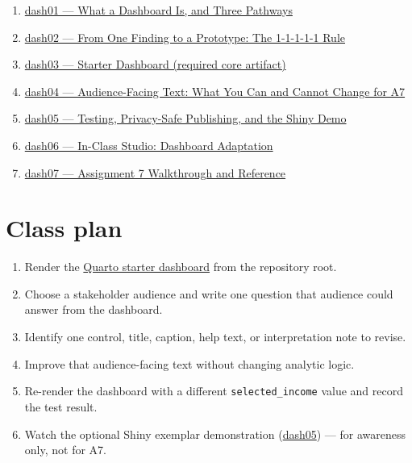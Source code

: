 \documentclass[
  letterpaper,
  DIV=11,
  numbers=noendperiod,
  oneside]{scrreprt}
\providecommand{\tightlist}{%
  \setlength{\itemsep}{0pt}\setlength{\parskip}{0pt}}
\begin{document}
\begin{enumerate}
\def\labelenumi{\arabic{enumi}.}
\tightlist
\item
  \href{dash01-overview-and-pathways.qmd}{dash01 --- What a Dashboard
  Is, and Three Pathways}
\item
  \href{dash02-from-eda-to-prototype.qmd}{dash02 --- From One Finding to
  a Prototype: The 1-1-1-1-1 Rule}
\item
  \href{dash03-starter-dashboard.qmd}{dash03 --- Starter Dashboard
  (required core artifact)}
\item
  \href{dash04-audience-and-ui-text.qmd}{dash04 --- Audience-Facing
  Text: What You Can and Cannot Change for A7}
\item
  \href{dash05-testing-privacy-and-shiny-demo.qmd}{dash05 --- Testing,
  Privacy-Safe Publishing, and the Shiny Demo}
\item
  \href{dash06-studio-dashboard-adaptation.qmd}{dash06 --- In-Class
  Studio: Dashboard Adaptation}
\item
  \href{dash07-assignment-a7-and-reference.qmd}{dash07 --- Assignment 7
  Walkthrough and Reference}
\end{enumerate}

\section*{Class plan}\label{class-plan-2}


\begin{enumerate}
\def\labelenumi{\arabic{enumi}.}
\tightlist
\item
  Render the \href{dash03-starter-dashboard.qmd}{Quarto starter
  dashboard} from the repository root.
\item
  Choose a stakeholder audience and write one question that audience
  could answer from the dashboard.
\item
  Identify one control, title, caption, help text, or interpretation
  note to revise.
\item
  Improve that audience-facing text without changing analytic logic.
\item
  Re-render the dashboard with a different \texttt{selected\_income}
  value and record the test result.
\item
  Watch the optional Shiny exemplar demonstration
  (\href{dash05-testing-privacy-and-shiny-demo.qmd}{dash05}) --- for
  awareness only, not for A7.
\end{enumerate}
\end{document}
